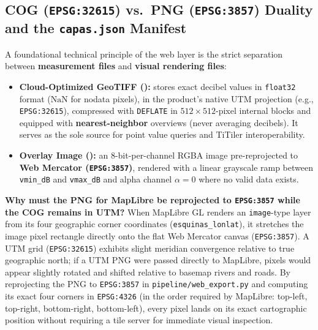 \documentclass[11pt,a4paper]{article}
\newcommand{\src}[1]{\nolinkurl{#1}}
\begin{document}
\subsection{COG (\texttt{EPSG:32615}) vs.\ PNG (\texttt{EPSG:3857}) Duality and the \texttt{capas.json} Manifest}

A foundational technical principle of the web layer is the strict separation between \textbf{measurement files}
and \textbf{visual rendering files}:
\begin{itemize}
  \item \textbf{Cloud-Optimized GeoTIFF ():} stores exact decibel values
        in \texttt{float32} format ($\mathrm{NaN}$ for nodata pixels), in the product's native UTM projection
        (e.g., \texttt{EPSG:32615}), compressed with \texttt{DEFLATE} in $512\times 512$-pixel internal blocks
        and equipped with \textbf{nearest-neighbor} overviews (never averaging decibels). It serves as the sole
        source for point value queries and TiTiler interoperability.
  \item \textbf{Overlay Image ():} an 8-bit-per-channel RGBA image
        pre-reprojected to \textbf{Web Mercator (\texttt{EPSG:3857})}, rendered with a linear grayscale ramp
        between \texttt{vmin\_dB} and \texttt{vmax\_dB} and alpha channel $\alpha = 0$ where no valid data exists.
\end{itemize}

\begin{intuicion}
\textbf{Why must the PNG for MapLibre be reprojected to \texttt{EPSG:3857} while the COG remains in UTM?}
When MapLibre GL renders an \texttt{image}-type layer from its four geographic corner coordinates
(\texttt{esquinas\_lonlat}), it stretches the image pixel rectangle directly onto the flat Web Mercator canvas
(\texttt{EPSG:3857}). A UTM grid (\texttt{EPSG:32615}) exhibits slight meridian convergence relative to true
geographic north; if a UTM PNG were passed directly to MapLibre, pixels would appear slightly rotated and shifted
relative to basemap rivers and roads. By reprojecting the PNG to \texttt{EPSG:3857} in
\src{pipeline/web\_export.py} and computing its exact four corners in \texttt{EPSG:4326} (in the order required
by MapLibre: top-left, top-right, bottom-right, bottom-left), every pixel lands on its exact cartographic
position without requiring a tile server for immediate visual inspection.
\end{intuicion}
\end{document}
